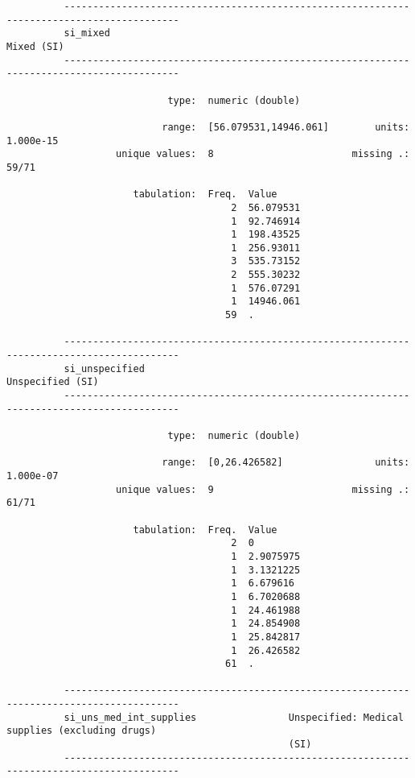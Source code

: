 \documentclass{article}
\begin{document}
\begin{verbatim}
          ------------------------------------------------------------------------------------------
          si_mixed                                                                        Mixed (SI)
          ------------------------------------------------------------------------------------------
          
                            type:  numeric (double)
          
                           range:  [56.079531,14946.061]        units:  1.000e-15
                   unique values:  8                        missing .:  59/71
          
                      tabulation:  Freq.  Value
                                       2  56.079531
                                       1  92.746914
                                       1  198.43525
                                       1  256.93011
                                       3  535.73152
                                       2  555.30232
                                       1  576.07291
                                       1  14946.061
                                      59  .
          
          ------------------------------------------------------------------------------------------
          si_unspecified                                                            Unspecified (SI)
          ------------------------------------------------------------------------------------------
          
                            type:  numeric (double)
          
                           range:  [0,26.426582]                units:  1.000e-07
                   unique values:  9                        missing .:  61/71
          
                      tabulation:  Freq.  Value
                                       2  0
                                       1  2.9075975
                                       1  3.1321225
                                       1  6.679616
                                       1  6.7020688
                                       1  24.461988
                                       1  24.854908
                                       1  25.842817
                                       1  26.426582
                                      61  .
          
          ------------------------------------------------------------------------------------------
          si_uns_med_int_supplies                Unspecified: Medical supplies (excluding drugs)
                                                 (SI)
          ------------------------------------------------------------------------------------------
          

\end{verbatim}
\end{document}
